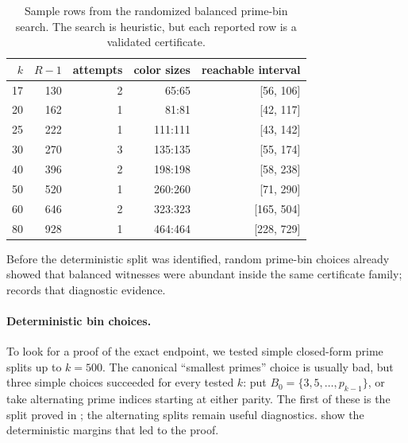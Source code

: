 \documentclass[11pt]{article}
\theoremstyle{plain}
\theoremstyle{definition}
\theoremstyle{remark}
\begin{document}
\begin{table}[htbp]
\centering
\caption{Sample rows from the randomized balanced prime-bin search.  The
search is heuristic, but each reported row is a validated certificate.}
\label{tab:balanced-random-prime-bin}
\small
\begin{tabular}{@{}rrrrr@{}}
\toprule
$k$ & $R-1$ & attempts & color sizes & reachable interval \\
\midrule
17 & 130 & 2 & 65:65 & [56, 106] \\
20 & 162 & 1 & 81:81 & [42, 117] \\
25 & 222 & 1 & 111:111 & [43, 142] \\
30 & 270 & 3 & 135:135 & [55, 174] \\
40 & 396 & 2 & 198:198 & [58, 238] \\
50 & 520 & 1 & 260:260 & [71, 290] \\
60 & 646 & 2 & 323:323 & [165, 504] \\
80 & 928 & 1 & 464:464 & [228, 729] \\
\bottomrule
\end{tabular}

\end{table}

Before the deterministic split was identified, random prime-bin choices
already showed that balanced witnesses were abundant inside the same
certificate family;  records that
diagnostic evidence.

\paragraph{Deterministic bin choices.}
To look for a proof of the exact endpoint, we tested simple closed-form prime
splits up to $k=500$.  The canonical ``smallest primes'' choice is usually
bad, but three simple choices succeeded for every tested $k$: put
$B_0=\{3,5,\ldots,p_{k-1}\}$, or take alternating prime indices starting at
either parity.  The first of these is the split proved in
; the alternating splits remain useful diagnostics.
show the deterministic margins that led to the proof.
\end{document}
